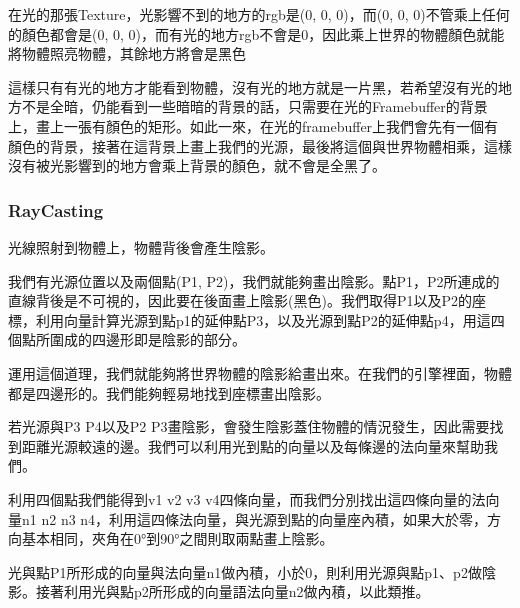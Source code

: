 在光的那張Texture，光影響不到的地方的rgb是(0, 0, 0)，而(0, 0, 0)不管乘上任何的顏色都會是(0, 0, 0)，而有光的地方rgb不會是0，因此乘上世界的物體顏色就能將物體照亮物體，其餘地方將會是黑色

這樣只有有光的地方才能看到物體，沒有光的地方就是一片黑，若希望沒有光的地方不是全暗，仍能看到一些暗暗的背景的話，只需要在光的Framebuffer的背景上，畫上一張有顏色的矩形。如此一來，在光的framebuffer上我們會先有一個有顏色的背景，接著在這背景上畫上我們的光源，最後將這個與世界物體相乘，這樣沒有被光影響到的地方會乘上背景的顏色，就不會是全黑了。

\subsubsection{RayCasting}

光線照射到物體上，物體背後會產生陰影。

我們有光源位置以及兩個點(P1, P2)，我們就能夠畫出陰影。點P1，P2所連成的直線背後是不可視的，因此要在後面畫上陰影(黑色)。我們取得P1以及P2的座標，利用向量計算光源到點p1的延伸點P3，以及光源到點P2的延伸點p4，用這四個點所圍成的四邊形即是陰影的部分。

運用這個道理，我們就能夠將世界物體的陰影給畫出來。在我們的引擎裡面，物體都是四邊形的。我們能夠輕易地找到座標畫出陰影。

若光源與P3 P4以及P2 P3畫陰影，會發生陰影蓋住物體的情況發生，因此需要找到距離光源較遠的邊。我們可以利用光到點的向量以及每條邊的法向量來幫助我們。

利用四個點我們能得到v1 v2 v3 v4四條向量，而我們分別找出這四條向量的法向量n1 n2 n3 n4，利用這四條法向量，與光源到點的向量座內積，如果大於零，方向基本相同，夾角在0°到90°之間則取兩點畫上陰影。

光與點P1所形成的向量與法向量n1做內積，小於0，則利用光源與點p1、p2做陰影。接著利用光與點p2所形成的向量語法向量n2做內積，以此類推。

